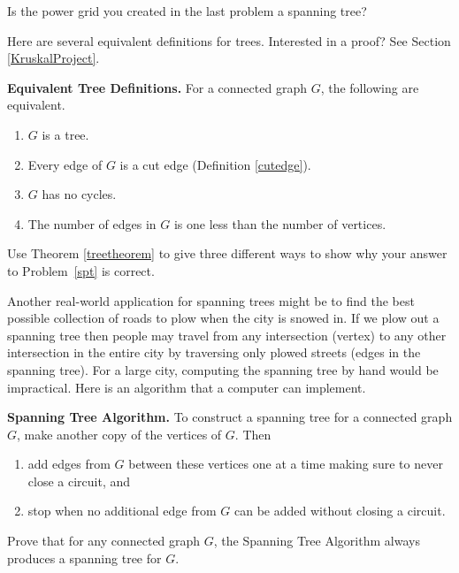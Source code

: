 \begin{prb}
Is the power grid you created in the last problem a spanning tree?
\end{prb}

Here are several equivalent definitions for trees. Interested in a proof?  See Section \ref{KruskalProject}.
\begin{thm} \label{treetheorem}
\textbf{Equivalent Tree Definitions.} For a connected graph $G$, the following are equivalent.
  \begin{enumerate}
     \item $G$ is a tree.
     \item Every edge of $G$ is a cut edge (Definition \ref{cutedge}).
     \item $G$ has no cycles.
     \item The number of edges in $G$ is one less than the number of vertices.
  \end{enumerate}
\end{thm}

\begin{prb}
Use Theorem \ref{treetheorem} to give three different ways to show why your answer to Problem~\ref{spt} is correct.
\end{prb}

Another real-world application for spanning trees might be to find the best possible collection of roads to plow when the city is snowed in.   If we plow out a spanning tree then people may travel from any intersection (vertex) to any other intersection in the entire city by traversing only plowed streets (edges in the spanning tree).  For a large city, computing the spanning tree by hand would be impractical.   Here is an algorithm that a computer can implement.

\begin{thm}
\textbf{Spanning Tree  Algorithm.} To construct a spanning tree for a connected graph  $G$, make another copy of the vertices of $G$. Then
\begin{enumerate}
\item add edges from  $G$  between these vertices one at a time making sure to never close a circuit, and
\item stop when no additional edge from $G$ can be added without closing a circuit.
\end{enumerate}
\end{thm}

\begin{prb}
Prove that for any connected graph  $G$, the Spanning Tree Algorithm always produces a spanning tree for $G$.
\begin{annotation}
\end{annotation}
\end{prb}

